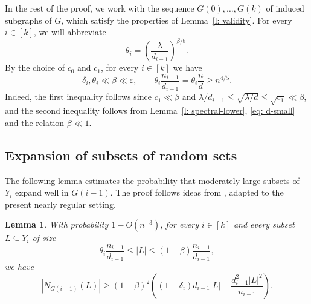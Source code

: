 \documentclass[reqno,a4paper]{amsart}
\newtheorem{lemma}[theorem]{Lemma}
\theoremstyle{definition}
\newcommand{\eps}{\varepsilon}
\begin{document}
In the rest of the proof, we work with the sequence $G(0),\ldots,G(k)$ of induced subgraphs of $G$, which satisfy the properties of Lemma~\ref{l: validity}. 
For every $i\in [k]$, we will abbreviate
\begin{equation}\label{eq: theta-def}
    \theta_i=\left(\frac{\lambda}{d_{i-1}}\right)^{\beta/8}.
\end{equation}
By the choice of $c_0$ and $c_1$, for every $i\in[k]$ we have
\begin{equation}\label{eq: theta-bounds}
    \delta_i,\theta_i\ll\beta\ll\eps,
    \qquad
    \theta_i\frac{n_{i-1}}{d_{i-1}} = \theta_i\frac{n}{d}\ge n^{4/5}.
\end{equation}
Indeed, the first inequality follows since $c_1\ll \beta$ and $\lambda/d_{i-1}\le \sqrt{\lambda/d}\le \sqrt{c_1}\ll \beta$, and the second inequality follows from Lemma~\ref{l: spectral-lower}, \eqref{eq: d-small} and the relation $\beta\ll 1$.

\subsection{Expansion of subsets of random sets}\label{s: expansion}
The following lemma estimates the probability that moderately large subsets of $Y_i$ expand well in $G(i-1)$. The proof follows ideas from \cite[Lemma 3.1]{K15}, adapted to the present nearly regular setting.

\begin{lemma}\label{l: expansion}
With probability $1-O(n^{-3})$, for every $i\in[k]$ and every subset $L\subseteq Y_i$ of size
\[
    \theta_i\frac{n_{i-1}}{d_{i-1}}\le |L|\le (1-\beta)\frac{n_{i-1}}{d_{i-1}},
\]
we have
\[
    |N_{G(i-1)}(L)|\ge (1-\beta)^2\left((1-\delta_i)d_{i-1}|L|-\frac{d_{i-1}^2|L|^2}{n_{i-1}}\right).
\]
\end{lemma}
\end{document}
